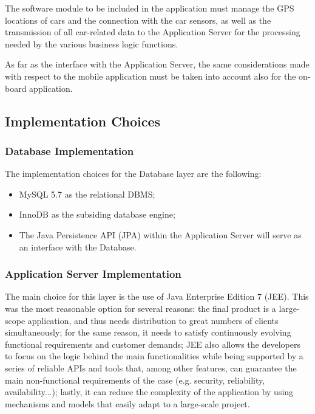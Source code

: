 The software module to be included in the application must manage the GPS locations of cars and the connection with the car sensors, as well as the transmission of all car-related data to the Application Server for the processing needed by the various business logic functions.

As far as the interface with the Application Server, the same considerations made with respect to the mobile application must be taken into account also for the on-board application.


\subsection{Implementation Choices}
\subsubsection{Database Implementation}
The implementation choices for the Database layer are the following:
\begin{itemize}
\item MySQL 5.7 as the relational DBMS;
\item InnoDB as the subsiding database engine;
\item The Java Persistence API (JPA) within the Application Server will serve as an interface with the Database.
\end{itemize}

\subsubsection{Application Server Implementation}
The main choice for this layer is the use of Java Enterprise Edition 7 (JEE). This was the most reasonable option for several reasons: the final product is a large-scope application, and thus needs distribution to great numbers of clients simultaneously; for the same reason, it needs to satisfy continuously evolving functional requirements and customer demands; JEE also allows the developers to focus on the logic behind the main functionalities while being supported by a series of reliable APIs and tools that, among other features, can guarantee the main non-functional requirements of the case (e.g. security, reliability, availability...); lastly, it can reduce the complexity of the application by using mechanisms and models that easily adapt to a large-scale project.

